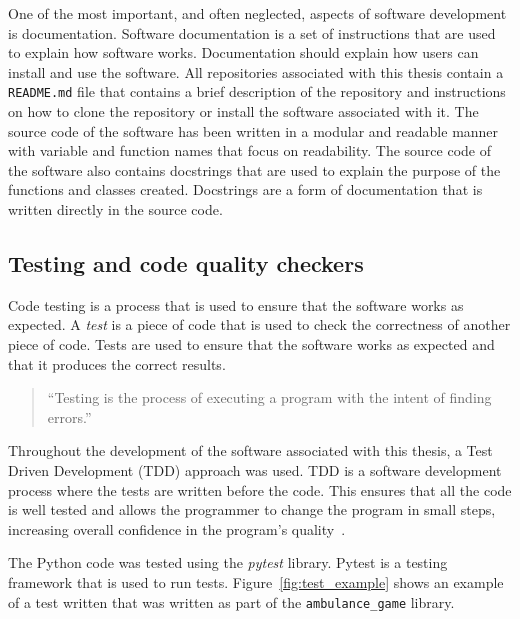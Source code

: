 One of the most important, and often neglected, aspects of software development
is documentation.
Software documentation is a set of instructions that are used to explain how
software works.
Documentation should explain how users can install and use the software.
All repositories associated with this thesis contain a \texttt{README.md} file
that contains a brief description of the repository and instructions on how to
clone the repository or install the software associated with it.
The source code of the software has been written in a modular and readable
manner with variable and function names that focus on readability.
The source code of the software also contains docstrings that are used to
explain the purpose of the functions and classes created.
Docstrings are a form of documentation that is written directly in the source
code.


\subsection{Testing and code quality checkers}\label{sec:intro_test_code}

Code testing is a process that is used to ensure that the software works as
expected.
A \textit{test} is a piece of code that is used to check the correctness of
another piece of code.
Tests are used to ensure that the software works as expected and that it
produces the correct results.

\begin{quotation}
    ``Testing is the process of executing a program with the intent of finding
    errors.''~\cite{myers2011art}
\end{quotation}


Throughout the development of the software associated with this thesis, a
Test Driven Development (TDD) approach was used.
TDD is a software development process where the tests are written before the
code.
This ensures that all the code is well tested and allows the programmer to
change the program in small steps, increasing overall confidence in the
program's quality~\cite{astels2003test}.

The Python code was tested using the \textit{pytest} library.
Pytest is a testing framework that is used to run tests.
Figure~\ref{fig:test_example} shows an example of a test written that was
written as part of the \texttt{ambulance\_game} library.

